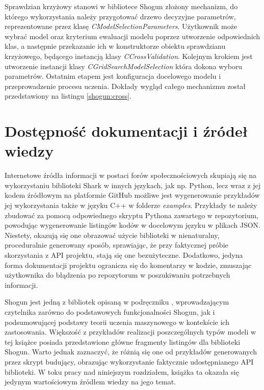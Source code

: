 Sprawdzian krzyżowy stanowi w bibliotece Shogun złożony mechanizm, do którego wykorzystania należy przygotować drzewo decyzyjne parametrów, reprezentowane przez klasę \textit{CModelSelectionParameters}. Użytkownik może wybrać model oraz kryterium ewaluacji modelu poprzez utworzenie odpowiednich klas, a następnie przekazanie ich w konstruktorze obiektu sprawdzianu krzyżowego, będącego instancją klasy \textit{CCrossValidation}. Kolejnym krokiem jest utworzenie instancji klasy \textit{CGridSearchModelSelection} która dokona wyboru parametrów. Ostatnim etapem jest konfiguracja docelowego modelu i przeprowadzenie procesu uczenia. Dokłady wygląd całego mechanizmu został przedstawiony na listingu \ref{shogun:cross}.


\section{Dostępność dokumentacji i źródeł wiedzy}

Internetowe źródła informacji w postaci forów społecznościowych skupiają się na wykorzystaniu biblioteki Shark w innych językach, jak np. Python, lecz wraz z jej kodem źródłowym na platformie GitHub \cite{shogun:github} możliwe jest wygenerowanie przykładów jej wykorzystania także w języku C++ w folderze \textit{examples}. Przykłady te należy zbudować za pomocą odpowiednego skryptu Pythona zawartego w repozytorium, powodując wygenerowanie listingów kodów w docelowym języku w plikach JSON. Niestety, okazują się one obrazować użycie biblioteki w nienaturalny, proceduralnie generowany sposób, sprawiając, że przy faktycznej próbie skorzystania z API projektu, stają się one bezużyteczne. Dodatkowo, jedyna forma dokumentacji projektu ogranicza się do komentarzy w kodzie, zmuszając użytkownika do błądzenia po repozytorum w poszukiwaniu potrzebnych informacji. 

Shogun jest jedną z bibliotek opisaną w podręczniku \cite{handsOnMachineLearning}, wprowadzającym czytelnika zarówno do podstawowych funkcjonalności Shogun, jak i podsumowującej podstawy teorii uczenia maszynowego w kontekście ich zastosowania. Większość z przykładów realizacji poszczególnych typów modeli w tej książce posiada przedstawione główne fragmenty listingów dla biblioteki Shogun. Warto jednak zaznaczyć, że różnią się one od przykładów generowanych przez skrypt budujący, obrazując wykorzystanie faktycznie udostępnianego API biblioteki. W toku pracy nad niniejszym rozdziałem, książka ta okazała się jedynym wartościowym źródłem wiedzy na jego temat.